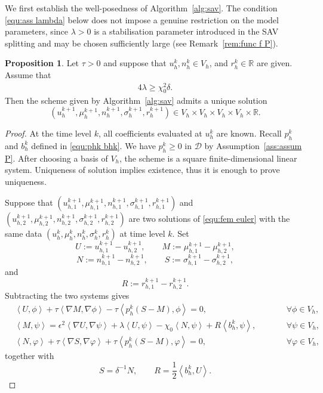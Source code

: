 \documentclass[11pt, reqno]{amsart}
\theoremstyle{definition}
\newtheorem{proposition}[theorem]{Proposition}
\numberwithin{equation}{section}
\newcommand{\inpro}[2]{\left\langle#1,#2\right\rangle}
\begin{document}
We first establish the well-posedness of Algorithm~\ref{alg:sav}. 
The condition \eqref{equ:ass lambda} below does not impose a genuine restriction on the model parameters, since $\lambda>0$ is a stabilisation parameter introduced in the SAV splitting and may be chosen sufficiently large (see Remark~\ref{rem:func f P}).

{
	\begin{proposition}\label{pro:well-posed}
		Let $\tau>0$ and suppose that $u_h^k,n_h^k\in V_h$, and $r_h^k\in\mathbb{R}$ are given. 
		Assume that
		\begin{align}\label{equ:ass lambda}
			4\lambda \ge \chi_0^2\delta .
		\end{align}
		Then the scheme given by Algorithm~\ref{alg:sav} admits a unique solution
		\[
		(u_h^{k+1},\mu_h^{k+1},n_h^{k+1},\sigma_h^{k+1},r_h^{k+1})
		\in V_h\times V_h\times V_h\times V_h\times \mathbb R .
		\]
	\end{proposition}
	
	\begin{proof}
		At the time level $k$, all coefficients evaluated at $u_h^k$ are known. Recall $p_h^k$ and $b_h^k$ defined in \eqref{equ:phk bhk}.
		We have $p_h^k\ge 0$ in $\mathscr D$ by Assumption~\ref{ass:assum P}.
		After choosing a basis of $V_h$, the scheme is a square finite-dimensional linear system. Uniqueness of solution implies existence, thus it is enough to prove uniqueness.
		
		Suppose that $(u_{h,1}^{k+1},\mu_{h,1}^{k+1},n_{h,1}^{k+1},\sigma_{h,1}^{k+1},r_{h,1}^{k+1})$
		and
		$(u_{h,2}^{k+1},\mu_{h,2}^{k+1},n_{h,2}^{k+1},\sigma_{h,2}^{k+1},r_{h,2}^{k+1})$
		are two solutions of \eqref{equ:fem euler} with the same data $(u_{h}^{k},\mu_{h}^{k},n_{h}^{k},\sigma_{h}^{k},r_{h}^{k})$ at time level $k$. Set
		\[
		U:=u_{h,1}^{k+1}-u_{h,2}^{k+1},
		\qquad
		M:=\mu_{h,1}^{k+1}-\mu_{h,2}^{k+1},
		\]
		\[
		N:=n_{h,1}^{k+1}-n_{h,2}^{k+1},
		\qquad
		S:=\sigma_{h,1}^{k+1}-\sigma_{h,2}^{k+1},
		\]
		and
		\[
		R:=r_{h,1}^{k+1}-r_{h,2}^{k+1}.
		\]
		Subtracting the two systems gives
		\begin{subequations}\label{equ:lin sys}
			\begin{alignat}{2}
				\label{eq:diff-u-wellposed}
				&\inpro{U}{\phi}
				+
				\tau \inpro{\nabla M}{\nabla \phi}
				-
				\tau\inpro{p_h^k(S-M)}{\phi}
				=0,
				\qquad
				&&\forall \phi\in V_h,
				\\
				\label{eq:diff-mu-wellposed}
				&\inpro{M}{\psi}
				=
				\epsilon^2\inpro{\nabla U}{\nabla \psi}
				+
				\lambda\inpro{U}{\psi}
				-
				\chi_0\inpro{N}{\psi}
				+
				R\inpro{b_h^k}{\psi},
				\qquad
				&&\forall \psi\in V_h,
				\\
				\label{eq:diff-n-wellposed}
				&\inpro{N}{\varphi}
				+
				\tau\inpro{\nabla S}{\nabla \varphi}
				+
				\tau\inpro{p_h^k(S-M)}{\varphi}
				=0,
				\qquad
				&&\forall \varphi\in V_h,
			\end{alignat}
		\end{subequations}
		together with
		\begin{equation}
			\label{eq:diff-sigma-r-wellposed}
			S=\delta^{-1}N,
			\qquad
			R=\frac12\inpro{b_h^k}{U}.
		\end{equation}
		

\end{proof}}
\end{document}
